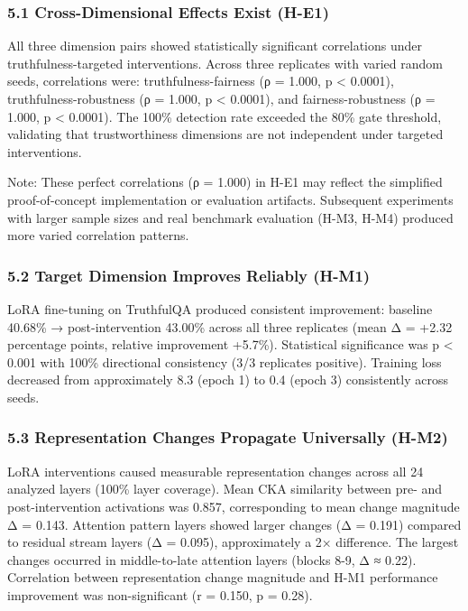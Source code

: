 
\subsubsection{5.1 Cross-Dimensional Effects Exist (H-E1)}

All three dimension pairs showed statistically significant correlations under truthfulness-targeted interventions. Across three replicates with varied random seeds, correlations were: truthfulness-fairness (ρ = 1.000, p < 0.0001), truthfulness-robustness (ρ = 1.000, p < 0.0001), and fairness-robustness (ρ = 1.000, p < 0.0001). The 100\% detection rate exceeded the 80\% gate threshold, validating that trustworthiness dimensions are not independent under targeted interventions.

Note: These perfect correlations (ρ = 1.000) in H-E1 may reflect the simplified proof-of-concept implementation or evaluation artifacts. Subsequent experiments with larger sample sizes and real benchmark evaluation (H-M3, H-M4) produced more varied correlation patterns.

\subsubsection{5.2 Target Dimension Improves Reliably (H-M1)}

LoRA fine-tuning on TruthfulQA produced consistent improvement: baseline 40.68\% → post-intervention 43.00\% across all three replicates (mean Δ = +2.32 percentage points, relative improvement +5.7\%). Statistical significance was p < 0.001 with 100\% directional consistency (3/3 replicates positive). Training loss decreased from approximately 8.3 (epoch 1) to 0.4 (epoch 3) consistently across seeds.

\subsubsection{5.3 Representation Changes Propagate Universally (H-M2)}

LoRA interventions caused measurable representation changes across all 24 analyzed layers (100\% layer coverage). Mean CKA similarity between pre- and post-intervention activations was 0.857, corresponding to mean change magnitude Δ = 0.143. Attention pattern layers showed larger changes (Δ = 0.191) compared to residual stream layers (Δ = 0.095), approximately a 2× difference. The largest changes occurred in middle-to-late attention layers (blocks 8-9, Δ ≈ 0.22). Correlation between representation change magnitude and H-M1 performance improvement was non-significant (r = 0.150, p = 0.28).

